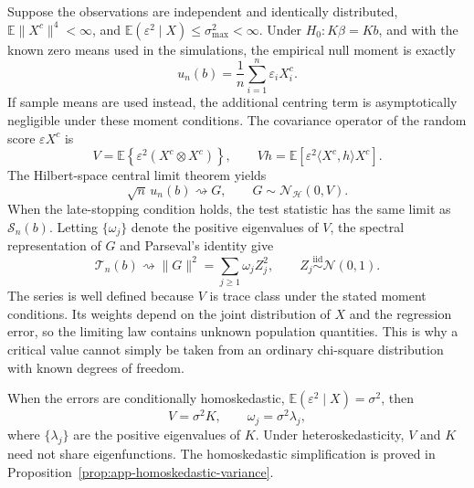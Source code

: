 Suppose the observations are independent and identically distributed,
$\mathbb E\|X^c\|^4<\infty$, and
$\mathbb E(\varepsilon^2\mid X)\leq\sigma_{\max}^2<\infty$.  Under
$H_0:K\beta=Kb$, and with the known zero means used in the simulations, the
empirical null moment is exactly
\begin{equation}
    u_n(b)=\frac1n\sum_{i=1}^{n}\varepsilon_iX_i^c.
    \label{eq:inference-null-score-average}
\end{equation}
If sample means are used instead, the additional centring term is
asymptotically negligible under these moment conditions.  The covariance
operator of the random score $\varepsilon X^c$ is
\begin{equation}
    V
    =\mathbb E\!\left\{\varepsilon^2
       (X^c\otimes X^c)\right\},
    \qquad
    Vh=\mathbb E\!\left[\varepsilon^2
       \langle X^c,h\rangle X^c\right].
    \label{eq:inference-variance-operator}
\end{equation}
The Hilbert-space central limit theorem yields
\begin{equation}
    \sqrt n\,u_n(b)\rightsquigarrow G,
    \qquad G\sim\mathcal N_{\mathcal H}(0,V).
    \label{eq:inference-hilbert-clt}
\end{equation}
When the late-stopping condition holds, the test statistic has the same
limit as $\mathcal S_n(b)$.  Letting $\{\omega_j\}$ denote the positive
eigenvalues of $V$, the spectral representation of $G$ and Parseval's
identity give
\begin{equation}
    \mathcal T_n(b)
    \rightsquigarrow
    \|G\|^2
    =\sum_{j\geq1}\omega_jZ_j^2,
    \qquad Z_j\stackrel{\mathrm{iid}}{\sim}\mathcal N(0,1).
    \label{eq:inference-weighted-chi-square}
\end{equation}
The series is well defined because $V$ is trace class under the stated
moment conditions.  Its weights depend on the joint distribution of $X$ and
the regression error, so the limiting law contains unknown population
quantities.  This is why a critical value cannot simply be taken from an
ordinary chi-square distribution with known degrees of freedom.

When the errors are conditionally homoskedastic,
$\mathbb E(\varepsilon^2\mid X)=\sigma^2$, then
\begin{equation}
    V=\sigma^2K,
    \qquad
    \omega_j=\sigma^2\lambda_j,
    \label{eq:inference-homoskedastic-weights}
\end{equation}
where $\{\lambda_j\}$ are the positive eigenvalues of $K$.  Under
heteroskedasticity, $V$ and $K$ need not share eigenfunctions.  The
homoskedastic simplification is proved in
Proposition~\ref{prop:app-homoskedastic-variance}.

